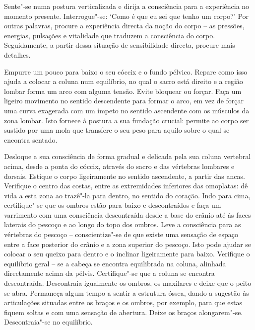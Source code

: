 \bigskip

Sente"-se numa postura verticalizada e dirija a consciência para a experiência no
momento presente. Interrogue"-se: `Como é que eu sei que tenho um corpo?' Por
outras palavras, procure a experiência directa da noção do corpo -- as pressões,
energias, pulsações e vitalidade que traduzem a consciência do corpo.
Seguidamente, a partir dessa situação de sensibilidade directa, procure mais
detalhes.

Empurre um pouco para baixo o seu cóccix e o fundo pélvico. Repare como isso
ajuda a colocar a coluna num equilíbrio, no qual o sacro está direito e a região
lombar forma um arco com alguma tensão. Evite bloquear ou forçar. Faça um
ligeiro movimento no sentido descendente para formar o arco, em vez de forçar
uma curva exagerada com um ímpeto no sentido ascendente com os músculos da zona
lombar. Isto fornece à postura a sua fundação crucial: permite ao corpo ser
sustido por uma mola que transfere o seu peso para aquilo sobre o qual se
encontra sentado.

\enlargethispage{\baselineskip}

Desloque a sua consciência de forma gradual e delicada pela sua coluna vertebral
acima, desde a ponta do cóccix, através do sacro e das vértebras lombares e
dorsais. Estique o corpo ligeiramente no sentido ascendente, a partir das ancas.
Verifique o centro das costas, entre as extremidades inferiores das omoplatas:
dê vida a esta zona ao trazê"-la para dentro, no sentido do coração. Indo para
cima, certifique"-se que os ombros estão para baixo e descontraídos e faça um
varrimento com uma consciência descontraída desde a base do crânio até às faces
laterais do pescoço e ao longo do topo dos ombros. Leve a consciência para as
vértebras do pescoço -- conscientize"-se de que existe uma sensação de espaço
entre a face posterior do crânio e a zona superior do pescoço. Isto pode ajudar
se colocar o seu queixo para dentro e o inclinar ligeiramente para baixo.
Verifique o equilíbrio geral -- se a cabeça se encontra equilibrada na coluna,
alinhada directamente acima da pélvis. Certifique"-se que a coluna se encontra
descontraída. Descontraia igualmente os ombros, os maxilares e deixe que o peito
se abra. Permaneça algum tempo a sentir a estrutura óssea, dando a sugestão às
articulações situadas entre os braços e os ombros, por exemplo, para que estas
fiquem soltas e com uma sensação de abertura. Deixe os braços alongarem"-se.
Descontraia"-se no equilíbrio.

\enlargethispage{\baselineskip}

